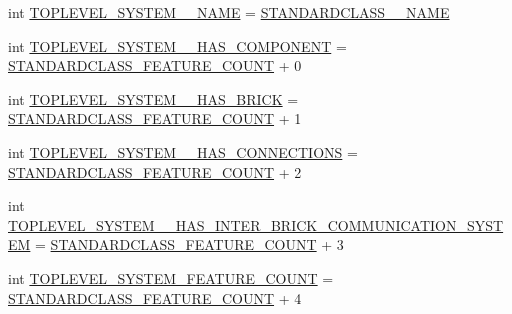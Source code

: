\begin{DoxyCompactItemize}
\item 
int \hyperlink{interfaceshootingmachineemfmodel_1_1_shootingmachineemfmodel_package_a49fbed77ed7c350ed16c1ca68bffbd1f}{T\-O\-P\-L\-E\-V\-E\-L\-\_\-\-S\-Y\-S\-T\-E\-M\-\_\-\-\_\-\-N\-A\-M\-E} = \hyperlink{interfaceshootingmachineemfmodel_1_1_shootingmachineemfmodel_package_a06475d7d54d52ee19b2aaf4d5d73c738}{S\-T\-A\-N\-D\-A\-R\-D\-C\-L\-A\-S\-S\-\_\-\-\_\-\-N\-A\-M\-E}
\item 
int \hyperlink{interfaceshootingmachineemfmodel_1_1_shootingmachineemfmodel_package_affc3e267a0f206f90ab17c0fbbbb61a7}{T\-O\-P\-L\-E\-V\-E\-L\-\_\-\-S\-Y\-S\-T\-E\-M\-\_\-\-\_\-\-H\-A\-S\-\_\-\-C\-O\-M\-P\-O\-N\-E\-N\-T} = \hyperlink{interfaceshootingmachineemfmodel_1_1_shootingmachineemfmodel_package_a14037f66989b3107e402142df96ee9aa}{S\-T\-A\-N\-D\-A\-R\-D\-C\-L\-A\-S\-S\-\_\-\-F\-E\-A\-T\-U\-R\-E\-\_\-\-C\-O\-U\-N\-T} + 0
\item 
int \hyperlink{interfaceshootingmachineemfmodel_1_1_shootingmachineemfmodel_package_ad730be94687f37e1a5f006803ca177f8}{T\-O\-P\-L\-E\-V\-E\-L\-\_\-\-S\-Y\-S\-T\-E\-M\-\_\-\-\_\-\-H\-A\-S\-\_\-\-B\-R\-I\-C\-K} = \hyperlink{interfaceshootingmachineemfmodel_1_1_shootingmachineemfmodel_package_a14037f66989b3107e402142df96ee9aa}{S\-T\-A\-N\-D\-A\-R\-D\-C\-L\-A\-S\-S\-\_\-\-F\-E\-A\-T\-U\-R\-E\-\_\-\-C\-O\-U\-N\-T} + 1
\item 
int \hyperlink{interfaceshootingmachineemfmodel_1_1_shootingmachineemfmodel_package_a8eee025fce0f0e49b8961846a79bc767}{T\-O\-P\-L\-E\-V\-E\-L\-\_\-\-S\-Y\-S\-T\-E\-M\-\_\-\-\_\-\-H\-A\-S\-\_\-\-C\-O\-N\-N\-E\-C\-T\-I\-O\-N\-S} = \hyperlink{interfaceshootingmachineemfmodel_1_1_shootingmachineemfmodel_package_a14037f66989b3107e402142df96ee9aa}{S\-T\-A\-N\-D\-A\-R\-D\-C\-L\-A\-S\-S\-\_\-\-F\-E\-A\-T\-U\-R\-E\-\_\-\-C\-O\-U\-N\-T} + 2
\item 
int \hyperlink{interfaceshootingmachineemfmodel_1_1_shootingmachineemfmodel_package_acf10829121e4e427b2a5f21852c6a490}{T\-O\-P\-L\-E\-V\-E\-L\-\_\-\-S\-Y\-S\-T\-E\-M\-\_\-\-\_\-\-H\-A\-S\-\_\-\-I\-N\-T\-E\-R\-\_\-\-B\-R\-I\-C\-K\-\_\-\-C\-O\-M\-M\-U\-N\-I\-C\-A\-T\-I\-O\-N\-\_\-\-S\-Y\-S\-T\-E\-M} = \hyperlink{interfaceshootingmachineemfmodel_1_1_shootingmachineemfmodel_package_a14037f66989b3107e402142df96ee9aa}{S\-T\-A\-N\-D\-A\-R\-D\-C\-L\-A\-S\-S\-\_\-\-F\-E\-A\-T\-U\-R\-E\-\_\-\-C\-O\-U\-N\-T} + 3
\item 
int \hyperlink{interfaceshootingmachineemfmodel_1_1_shootingmachineemfmodel_package_ae52b6b9f5d5a94fcbff140606a6a50b2}{T\-O\-P\-L\-E\-V\-E\-L\-\_\-\-S\-Y\-S\-T\-E\-M\-\_\-\-F\-E\-A\-T\-U\-R\-E\-\_\-\-C\-O\-U\-N\-T} = \hyperlink{interfaceshootingmachineemfmodel_1_1_shootingmachineemfmodel_package_a14037f66989b3107e402142df96ee9aa}{S\-T\-A\-N\-D\-A\-R\-D\-C\-L\-A\-S\-S\-\_\-\-F\-E\-A\-T\-U\-R\-E\-\_\-\-C\-O\-U\-N\-T} + 4

\end{DoxyCompactItemize}
